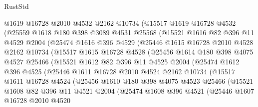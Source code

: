 \begin{lexlean}{RustStd}
\begin{coremodule}
        @1619
        @16728
        @2010
        @4532
        @2162
        @10734
        (@15517
          @1619
          @16728
          @4532
          (@25559
            @1618
            @180
            @398
            @3089
            @4531
            @25568
            (@15521
              @1616
              @82
              @396
              @11
              @4529
              @2004
              (@25474
                @1616
                @396
                @4529
                (@25446
                  @1615
                  @16728
                  @2010
                  @4528
                  @2162
                  @10734
                  (@15517
                    @1615
                    @16728
                    @4528
                    (@25456
                      @1614
                      @180
                      @398
                      @4075
                      @4527
                      @25466
                      (@15521
                        @1612
                        @82
                        @396
                        @11
                        @4525
                        @2004
                        (@25474
                          @1612
                          @396
                          @4525
                          (@25446
                            @1611
                            @16728
                            @2010
                            @4524
                            @2162
                            @10734
                            (@15517
                              @1611
                              @16728
                              @4524
                              (@25456
                                @1610
                                @180
                                @398
                                @4075
                                @4523
                                @25466
                                (@15521
                                  @1608
                                  @82
                                  @396
                                  @11
                                  @4521
                                  @2004
                                  (@25474
                                    @1608
                                    @396
                                    @4521
                                    (@25446
                                      @1607
                                      @16728
                                      @2010
                                      @4520

\end{coremodule}
\end{lexlean}
